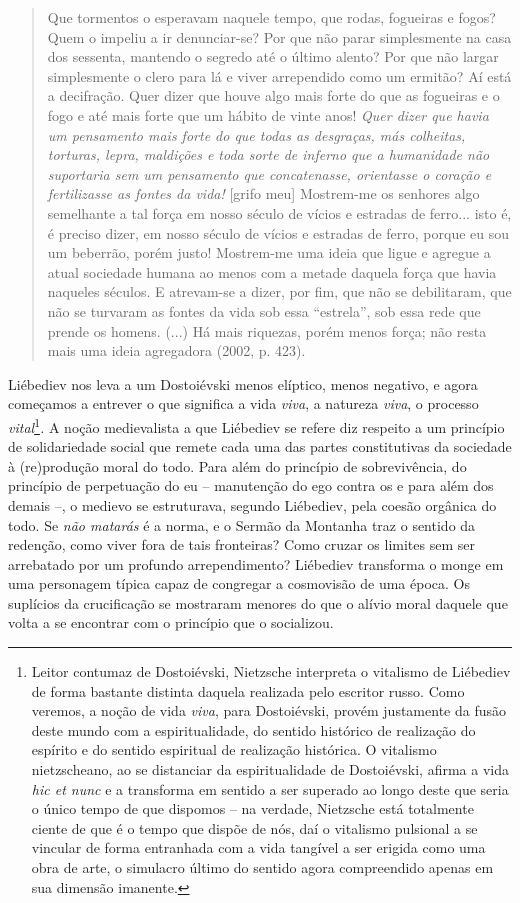\begin{quote}
Que tormentos o esperavam naquele tempo, que rodas, fogueiras e fogos?
Quem o impeliu a ir denunciar-se? Por que não parar simplesmente na casa
dos sessenta, mantendo o segredo até o último alento? Por que não largar
simplesmente o clero para lá e viver arrependido como um ermitão? Aí
está a decifração. Quer dizer que houve algo mais forte do que as
fogueiras e o fogo e até mais forte que um hábito de vinte anos!
\emph{Quer dizer que havia um pensamento mais forte do que todas as
desgraças, más colheitas, torturas, lepra, maldições e toda sorte de
inferno que a humanidade não suportaria sem um pensamento que
concatenasse, orientasse o coração e fertilizasse as fontes da vida!}
{[}grifo meu{]} Mostrem-me os senhores algo semelhante a tal força em
nosso século de vícios e estradas de ferro... isto é, é preciso dizer,
em nosso século de vícios e estradas de ferro, porque eu sou um
beberrão, porém justo! Mostrem-me uma ideia que ligue e agregue a atual
sociedade humana ao menos com a metade daquela força que havia naqueles
séculos. E atrevam-se a dizer, por fim, que não se debilitaram, que não
se turvaram as fontes da vida sob essa ``estrela'', sob essa rede que
prende os homens. (...) Há mais riquezas, porém menos força; não resta
mais uma ideia agregadora (2002, p. 423).
\end{quote}

Liébediev nos leva a um Dostoiévski menos elíptico, menos negativo, e
agora começamos a entrever o que significa a vida \emph{viva}, a
natureza \emph{viva}, o processo \emph{vital}\footnote{Leitor contumaz
  de Dostoiévski, Nietzsche interpreta o vitalismo de Liébediev de forma
  bastante distinta daquela realizada pelo escritor russo. Como veremos,
  a noção de vida \emph{viva}, para Dostoiévski, provém justamente da
  fusão deste mundo com a espiritualidade, do sentido histórico de
  realização do espírito e do sentido espiritual de realização
  histórica. O vitalismo nietzscheano, ao se distanciar da
  espiritualidade de Dostoiévski, afirma a vida \emph{hic et nunc} e a
  transforma em sentido a ser superado ao longo deste que seria o único
  tempo de que dispomos -- na verdade, Nietzsche está totalmente ciente
  de que é o tempo que dispõe de nós, daí o vitalismo pulsional a se
  vincular de forma entranhada com a vida tangível a ser erigida como
  uma obra de arte, o simulacro último do sentido agora compreendido
  apenas em sua dimensão imanente.}\emph{.} A noção medievalista a que
Liébediev se refere diz respeito a um princípio de solidariedade social
que remete cada uma das partes constitutivas da sociedade à (re)produção
moral do todo. Para além do princípio de sobrevivência, do princípio de
perpetuação do eu -- manutenção do ego contra os e para além dos demais
--, o medievo se estruturava, segundo Liébediev, pela coesão orgânica do
todo. Se \emph{não matarás} é a norma, e o Sermão da Montanha traz o
sentido da redenção, como viver fora de tais fronteiras? Como cruzar os
limites sem ser arrebatado por um profundo arrependimento? Liébediev
transforma o monge em uma personagem típica capaz de congregar a
cosmovisão de uma época. Os suplícios da crucificação se mostraram
menores do que o alívio moral daquele que volta a se encontrar com o
princípio que o socializou.

